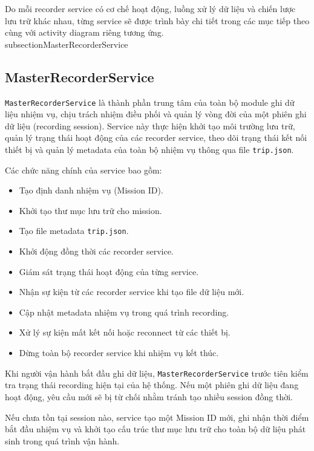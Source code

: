 \documentclass[../DoAn.tex]{subfiles}
\begin{document}
Do mỗi recorder service có cơ chế hoạt động, luồng xử lý dữ liệu và chiến lược lưu trữ khác nhau, từng service sẽ được trình bày chi tiết trong các mục tiếp theo cùng với activity diagram riêng tương ứng.
\\subsection{MasterRecorderService}

\subsection{MasterRecorderService}

\texttt{MasterRecorderService} là thành phần trung tâm của toàn bộ module ghi dữ liệu nhiệm vụ, chịu trách nhiệm điều phối và quản lý vòng đời của một phiên ghi dữ liệu (recording session). Service này thực hiện khởi tạo môi trường lưu trữ, quản lý trạng thái hoạt động của các recorder service, theo dõi trạng thái kết nối thiết bị và quản lý metadata của toàn bộ nhiệm vụ thông qua file \texttt{trip.json}.

Các chức năng chính của service bao gồm:

\begin{itemize}
    \item Tạo định danh nhiệm vụ (Mission ID).
    \item Khởi tạo thư mục lưu trữ cho mission.
    \item Tạo file metadata \texttt{trip.json}.
    \item Khởi động đồng thời các recorder service.
    \item Giám sát trạng thái hoạt động của từng service.
    \item Nhận sự kiện từ các recorder service khi tạo file dữ liệu mới.
    \item Cập nhật metadata nhiệm vụ trong quá trình recording.
    \item Xử lý sự kiện mất kết nối hoặc reconnect từ các thiết bị.
    \item Dừng toàn bộ recorder service khi nhiệm vụ kết thúc.
\end{itemize}

Khi người vận hành bắt đầu ghi dữ liệu, \texttt{MasterRecorderService} trước tiên kiểm tra trạng thái recording hiện tại của hệ thống. Nếu một phiên ghi dữ liệu đang hoạt động, yêu cầu mới sẽ bị từ chối nhằm tránh tạo nhiều session đồng thời.

Nếu chưa tồn tại session nào, service tạo một Mission ID mới, ghi nhận thời điểm bắt đầu nhiệm vụ và khởi tạo cấu trúc thư mục lưu trữ cho toàn bộ dữ liệu phát sinh trong quá trình vận hành.
\end{document}
